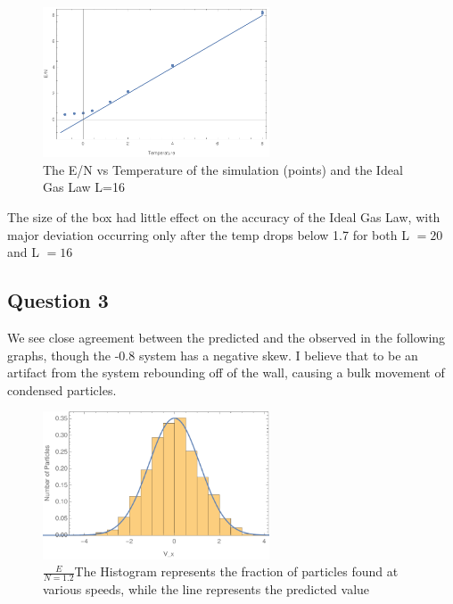 \documentclass{article}
\begin{document}
\begin{figure}[!htb]
	\begin{center}
		\includegraphics[width=0.6\textwidth]{p2b.pdf}
	\end{center}
	\caption{The E/N vs Temperature of the simulation (points) and the Ideal Gas Law L=16}
\label{fig:qual}
\end{figure}
\FloatBarrier

The size of the box had little effect on the accuracy of the Ideal Gas Law, with major deviation occurring only after the temp drops below 1.7 for both L $ = 20$ and L  $= 16$

\subsection{Question 3}

We see close agreement between the predicted and the observed in the following graphs, though the -0.8 system has a negative skew. I believe that to be an artifact from the system rebounding off of the wall, causing a bulk movement of condensed particles.

\begin{figure}[!htb]
	\begin{center}
		\includegraphics[width=0.6\textwidth]{p3a.pdf}
	\end{center}
	\caption{$\frac{E}{N=1.2}$The Histogram represents the fraction of particles found at various speeds, while the line represents the predicted value}
\label{fig:qual}
\end{figure}
\FloatBarrier
\end{document}
